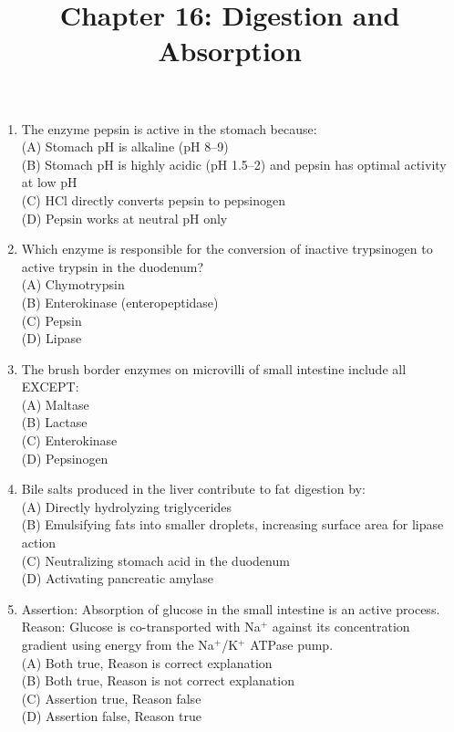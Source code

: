 \documentclass{article}
\begin{document}
\title{Chapter 16: Digestion and Absorption}
\date{}
\maketitle

\begin{enumerate}[label=Q\arabic*.]

\item The enzyme pepsin is active in the stomach because:
\\(A) Stomach pH is alkaline (pH 8--9)
\\(B) Stomach pH is highly acidic (pH 1.5--2) and pepsin has optimal activity at low pH
\\(C) HCl directly converts pepsin to pepsinogen
\\(D) Pepsin works at neutral pH only

\item Which enzyme is responsible for the conversion of inactive trypsinogen to active trypsin in the duodenum?
\\(A) Chymotrypsin
\\(B) Enterokinase (enteropeptidase)
\\(C) Pepsin
\\(D) Lipase

\item The brush border enzymes on microvilli of small intestine include all EXCEPT:
\\(A) Maltase
\\(B) Lactase
\\(C) Enterokinase
\\(D) Pepsinogen

\item Bile salts produced in the liver contribute to fat digestion by:
\\(A) Directly hydrolyzing triglycerides
\\(B) Emulsifying fats into smaller droplets, increasing surface area for lipase action
\\(C) Neutralizing stomach acid in the duodenum
\\(D) Activating pancreatic amylase

\item Assertion: Absorption of glucose in the small intestine is an active process.\\
Reason: Glucose is co-transported with Na$^+$ against its concentration gradient using energy from the Na$^+$/K$^+$ ATPase pump.
\\(A) Both true, Reason is correct explanation
\\(B) Both true, Reason is not correct explanation
\\(C) Assertion true, Reason false
\\(D) Assertion false, Reason true


\end{enumerate}
\end{document}
